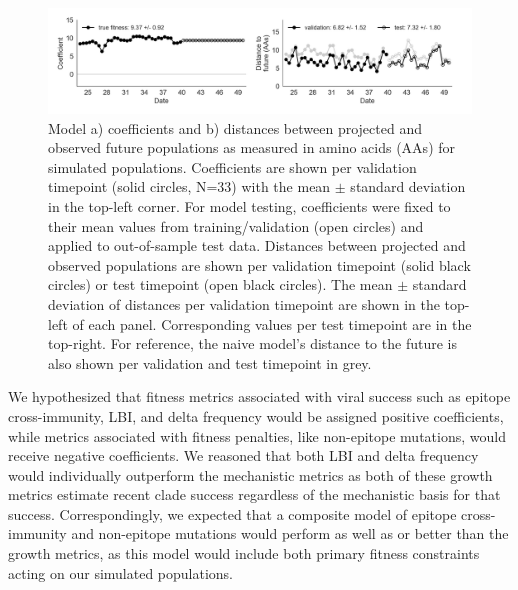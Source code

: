 \begin{figure}[ht!]
  \begin{center}
  \includegraphics[width=\textwidth]{figures/unadjusted-model-accuracy-and-coefficients-for-simulated-populations-controls.png}
  \caption{
    Model a) coefficients and b) distances between projected and observed future populations as measured in amino acids (AAs) for simulated populations.
    Coefficients are shown per validation timepoint (solid circles, N=33) with the mean $\pm$ standard deviation in the top-left corner.
    For model testing, coefficients were fixed to their mean values from training/validation (open circles) and applied to out-of-sample test data.
    Distances between projected and observed populations are shown per validation timepoint (solid black circles) or test timepoint (open black circles).
    The mean $\pm$ standard deviation of distances per validation timepoint are shown in the top-left of each panel.
    Corresponding values per test timepoint are in the top-right.
    For reference, the naive model's distance to the future is also shown per validation and test timepoint in grey.
  }
  \label{fig:unadjusted_model_accuracy_and_coefficients_for_simulated_populations_controls}
  \end{center}
\end{figure}

We hypothesized that fitness metrics associated with viral success such as epitope cross-immunity, LBI, and delta frequency would be assigned positive coefficients, while metrics associated with fitness penalties, like non-epitope mutations, would receive negative coefficients.
We reasoned that both LBI and delta frequency would individually outperform the mechanistic metrics as both of these growth metrics estimate recent clade success regardless of the mechanistic basis for that success.
Correspondingly, we expected that a composite model of epitope cross-immunity and non-epitope mutations would perform as well as or better than the growth metrics, as this model would include both primary fitness constraints acting on our simulated populations.

